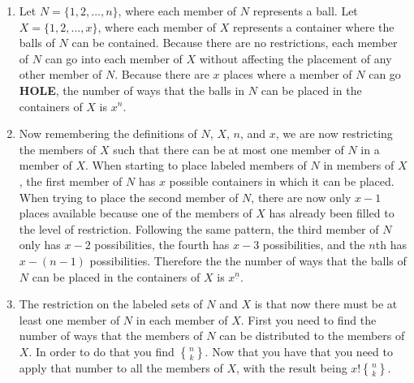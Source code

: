 \documentclass[10pt,a4paper]{report}
\DeclareRobustCommand{\stirling}{\genfrac\{\}{0pt}{}}
\begin{document}
\begin{enumerate}
	\item Let $N=\{1, 2, ..., n\}$, where each member of $N$ represents a ball.  Let $X=\{1, 2, ..., x\}$, where each member of $X$ represents a container where the balls of $N$ can be contained.  Because there are no restrictions, each member of $N$ can go into each member of $X$ without affecting the placement of any other member of $N$.  Because there are $x$ places where a member of $N$ can go \textbf{HOLE}, the number of ways that the balls in $N$ can be placed in the containers of $X$ is $x^{n}$.
	
	\item Now remembering the definitions of $N$, $X$, $n$, and $x$, we are now restricting the members of $X$ such that there can be at most one member of $N$ in a member of $X$.  When starting to place labeled members of $N$ in members of $X$, the first member of $N$ has $x$ possible containers in which it can be placed.  When trying to place the second member of $N$, there are now only $x-1$ places available because one of the members of $X$ has already been filled to the level of restriction.  Following the same pattern, the third member of $N$ only has $x-2$ possibilities, the fourth has $x-3$ possibilities, and the $n$th has $x-(n-1)$ possibilities.  Therefore the the number of ways that the balls of $N$ can be placed in the containers of $X$ is $x^{\underline{n}}$.
	
	\item The restriction on the labeled sets of $N$ and $X$ is that now there must be at least one member of $N$ in each member of $X$.  First you need to find the number of ways that the members of $N$ can be distributed to the members of $X$.  In order to do that you find $\stirling{n}{k}$.  Now that you have that you need to apply that number to all the members of $X$, with the result being $x!\stirling{n}{k}$.
\end{enumerate}
\end{document}
